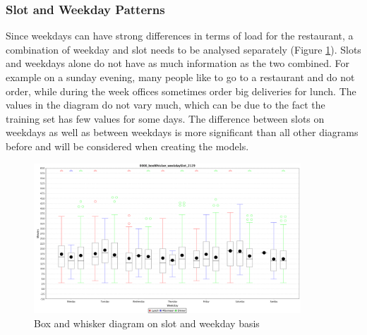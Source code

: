 \subsubsection{Slot and Weekday Patterns}
Since weekdays can have strong differences in terms of load for the restaurant, a combination of weekday and slot needs to be analysed separately (Figure \ref{fig:0000_boxWhisker_weekdaySlot_2129}).
Slots and weekdays alone do not have as much information as the two combined. For example on a sunday evening, many people like to go to a restaurant and do not order, while during the week offices sometimes order big deliveries for lunch. The values in the diagram do not vary much, which can be due to the fact the training set has few values for some days.\newline
The difference between slots on weekdays as well as between weekdays is more significant than all other diagrams before and will be considered when creating the models.

\begin{figure}[h]
\begin{center}
\includegraphics[width=10cm]{images/0000_boxWhisker_weekdaySlot_2129.png}
\caption{Box and whisker diagram on slot and weekday basis}
\label{fig:0000_boxWhisker_weekdaySlot_2129}
\end{center}
\end{figure}


